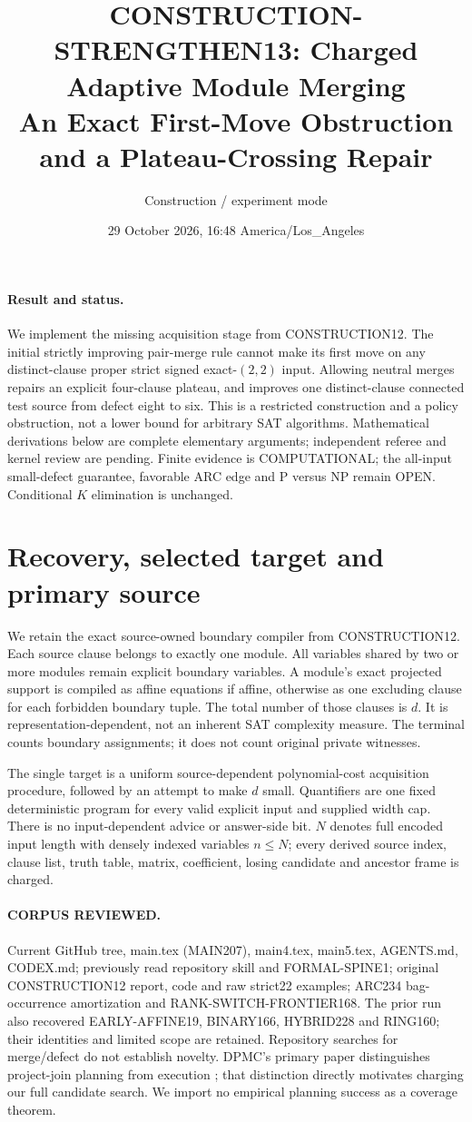 \documentclass[11pt]{article}
\title{CONSTRUCTION-STRENGTHEN13: Charged Adaptive Module Merging\\
An Exact First-Move Obstruction and a Plateau-Crossing Repair}
\author{Construction / experiment mode}
\date{29 October 2026, 16:48 America/Los\_Angeles}
\begin{document}
\sloppy\maketitle
\paragraph{Result and status.}
We implement the missing acquisition stage from CONSTRUCTION12.
The initial strictly improving pair-merge rule cannot make its first move
on any distinct-clause proper strict signed exact-$(2,2)$ input.
Allowing neutral merges repairs an explicit four-clause plateau, and
improves one distinct-clause connected test source from defect eight to six.
This is a restricted construction and a policy obstruction, not a lower
bound for arbitrary SAT algorithms. Mathematical derivations below are
complete elementary arguments; independent referee and kernel review are
pending. Finite evidence is COMPUTATIONAL; the all-input small-defect
guarantee, favorable ARC edge and P versus NP remain OPEN.
Conditional $K$ elimination is unchanged.

\section{Recovery, selected target and primary source}
We retain the exact source-owned boundary compiler from CONSTRUCTION12.
Each source clause belongs to exactly one module. All variables shared by
two or more modules remain explicit boundary variables. A module's exact
projected support is compiled as affine equations if affine, otherwise as
one excluding clause for each forbidden boundary tuple. The total number
of those clauses is $d$. It is representation-dependent, not an inherent
SAT complexity measure. The terminal counts boundary assignments; it does
not count original private witnesses.

The single target is a uniform source-dependent polynomial-cost acquisition
procedure, followed by an attempt to make $d$ small.
Quantifiers are one fixed deterministic program for every valid explicit
input and supplied width cap. There is no input-dependent advice or
answer-side bit. $N$ denotes full encoded input length with densely indexed
variables $n\le N$; every derived source index, clause list, truth table,
matrix, coefficient, losing candidate and ancestor frame is charged.

\paragraph{CORPUS REVIEWED.}
Current GitHub tree, main.tex (MAIN207), main4.tex, main5.tex, AGENTS.md,
CODEX.md; previously read repository skill and FORMAL-SPINE1; original
CONSTRUCTION12 report, code and raw strict22 examples;
ARC234 bag-occurrence amortization and RANK-SWITCH-FRONTIER168.
The prior run also recovered EARLY-AFFINE19, BINARY166, HYBRID228 and
RING160; their identities and limited scope are retained.
Repository searches for merge/defect do not establish novelty.
DPMC's primary paper distinguishes project-join planning from execution
\cite{dpmc}; that distinction directly motivates charging our full candidate
search. We import no empirical planning success as a coverage theorem.
\end{document}
